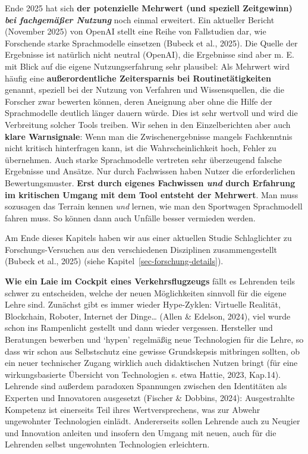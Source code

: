 \documentclass[
  ngerman,
  letterpaper,
  DIV=11]{scrreprt}
\begin{document}
Ende 2025 hat sich \textbf{der potenzielle Mehrwert (und speziell
Zeitgewinn) \emph{bei fachgemäßer Nutzung}} noch einmal erweitert. Ein
aktueller Bericht (November 2025) von OpenAI stellt eine Reihe von
Fallstudien dar, wie Forschende starke Sprachmodelle einsetzen (Bubeck
et al., 2025). Die Quelle der Ergebnisse ist natürlich nicht neutral
(OpenAI), die Ergebnisse sind aber m. E. mit Blick auf die eigene
Nutzungserfahrung sehr plausibel: Als Mehrwert wird häufig eine
\textbf{außerordentliche Zeitersparnis bei Routinetätigkeiten} genannt,
speziell bei der Nutzung von Verfahren und Wissensquellen, die die
Forscher zwar bewerten können, deren Aneignung aber ohne die Hilfe der
Sprachmodelle deutlich länger dauern würde. Dies ist sehr wertvoll und
wird die Verbreitung solcher Tools treiben. Wir sehen in den
Einzelberichten aber auch \textbf{klare Warnsignale}: Wenn man die
Zwischenergebnisse mangels Fachkenntnis nicht kritisch hinterfragen
kann, ist die Wahrscheinlichkeit hoch, Fehler zu übernehmen. Auch starke
Sprachmodelle vertreten sehr überzeugend falsche Ergebnisse und Ansätze.
Nur durch Fachwissen haben Nutzer die erforderlichen Bewertungsmuster.
\textbf{Erst durch eigenes Fachwissen \emph{und} durch Erfahrung im
kritischen Umgang mit dem Tool entsteht der Mehrwert}. Man muss
sozusagen das Terrain kennen \emph{und} lernen, wie man den Sportwagen
Sprachmodell fahren muss. So können dann auch Unfälle besser vermieden
werden.

Am Ende dieses Kapitels haben wir aus einer aktuellen Studie
Schlaglichter zu Forschungs-Versuchen aus den verschiedenen Disziplinen
zusammengestellt (Bubeck et al., 2025) (siehe
Kapitel~\ref{sec-forschung-details}).

\textbf{Wie ein Laie im Cockpit eines Verkehrsflugzeugs} fällt es
Lehrenden teils schwer zu entscheiden, welche der neuen Möglichkeiten
sinnvoll für die eigene Lehre sind. Zunächst gibt es immer wieder
Hype-Zyklen: Virtuelle Realität, Blockchain, Roboter, Internet der
Dinge\ldots{} (Allen \& Edelson, 2024), viel wurde schon ins Rampenlicht
gestellt und dann wieder vergessen. Hersteller und Beratungen bewerben
und `hypen' regelmäßig neue Technologien für die Lehre, so dass wir
schon aus Selbstschutz eine gewisse Grundskepsis mitbringen sollten, ob
ein neuer technischer Zugang wirklich auch didaktischen Nutzen bringt
(für eine wirkungsbasierte Übersicht von Technologien s. etwa Hattie,
2023, Kap.14). Lehrende sind außerdem paradoxen Spannungen zwischen den
Identitäten als Experten und Innovatoren ausgesetzt (Fischer \& Dobbins,
2024): Ausgestrahlte Kompetenz ist einerseits Teil ihres
Wertversprechens, was zur Abwehr ungewohnter Technologien einlädt.
Andererseits sollen Lehrende auch zu Neugier und Innovation anleiten und
insofern den Umgang mit neuen, auch für die Lehrenden selbst ungewohnten
Technologien erleichtern.
\end{document}
